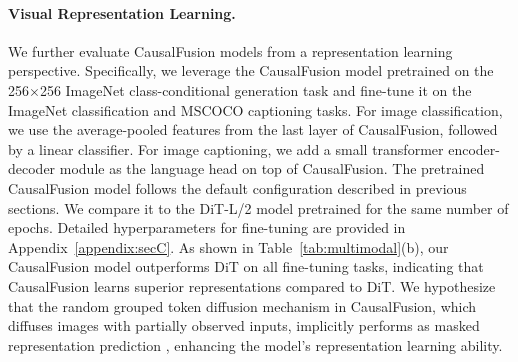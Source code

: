 \paragraph{Visual Representation Learning.} We further evaluate CausalFusion models from a representation learning perspective. Specifically, we leverage the CausalFusion model pretrained on the 256$\times$256 ImageNet class-conditional generation task and fine-tune it on the ImageNet classification and MSCOCO captioning tasks. For image classification, we use the average-pooled features from the last layer of CausalFusion, followed by a linear classifier. For image captioning, we add a small transformer encoder-decoder module as the language head on top of CausalFusion.
The pretrained CausalFusion model follows the default configuration described in previous sections. We compare it to the DiT-L/2 model pretrained for the same number of epochs. Detailed hyperparameters for fine-tuning are provided in Appendix~\ref{appendix:secC}. 
As shown in Table~\ref{tab:multimodal}(b), our CausalFusion model outperforms DiT on all fine-tuning tasks, indicating that CausalFusion learns superior representations compared to DiT. We hypothesize that the random grouped token diffusion mechanism in CausalFusion, which diffuses images with partially observed inputs, implicitly performs as masked representation prediction \cite{he2022masked, maskedpredict}, enhancing the model's representation learning ability.
